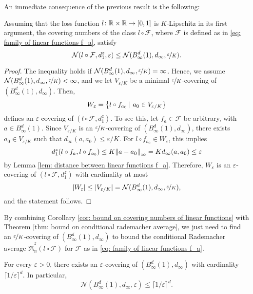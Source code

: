 An immediate consequence of the previous result is the following:

\begin{corollary}
\label{cor: bound on covering numbers of linear functions}
Assuming that the loss function $l \colon \mathbb{R} \times \mathbb{R} \to [0, 1]$ is $K$-Lipschitz in its first argument, the covering numbers of the class $l \circ \mathcal{F}$, where $\mathcal{F}$ is defined as in \eqref{eq: family of linear functions f_a}, satisfy
\[
    \mathcal{N}(l \circ \mathcal{F}, d_1^z, \varepsilon) \leq \mathcal{N}(B_{\infty}^d(1), d_{\infty}, \nicefrac{\varepsilon}{K}).
\]
\end{corollary}

\begin{proof}
The inequality holds if $\mathcal{N}(B_{\infty}^d(1), d_{\infty}, \nicefrac{\varepsilon}{K}) = \infty$. Hence, we assume $\mathcal{N}(B_{\infty}^d(1), d_{\infty}, \nicefrac{\varepsilon}{K}) < \infty$, and we let $V_{\varepsilon / K}$ be a minimal $\nicefrac{\varepsilon}{K}$-covering of $(B_{\infty}^d(1), d_{\infty})$. Then,
\[
    W_{\varepsilon} = \set{l \circ f_{a_0} \with a_0 \in V_{\varepsilon / K}}
\]
defines an $\varepsilon$-covering of $(l \circ \mathcal{F}, d_1^z)$. To see this, let $f_a \in \mathcal{F}$ be arbitrary, with $a \in B_{\infty}^d(1)$. Since $V_{\varepsilon / K}$ is an $\nicefrac{\varepsilon}{K}$-covering of $(B_{\infty}^d(1), d_{\infty})$, there exists $a_0 \in V_{\varepsilon / K}$ such that $d_{\infty}(a, a_0) \leq \varepsilon / K$. For $l \circ f_{a_0} \in W_{\varepsilon}$, this implies
\[
    d_1^z(l \circ f_a, l \circ f_{a_0}) \leq K \norm{a - a_0}_{\infty} = K d_{\infty}(a, a_0) \leq \varepsilon
\]
by Lemma \ref{lem: distance between linear functions f_a}. Therefore, $W_{\varepsilon}$ is an $\varepsilon$-covering of $(l \circ \mathcal{F}, d_1^z)$ with cardinality at most
\[
    \abs{W_{\varepsilon}} \leq \abs*{V_{\varepsilon / K}} = \mathcal{N}(B_{\infty}^d(1), d_{\infty}, \nicefrac{\varepsilon}{K}),
\]
and the statement follows.
\end{proof}

By combining Corollary \ref{cor: bound on covering numbers of linear functions} with Theorem \ref{thm: bound on conditional rademacher average}, we just need to find an $\nicefrac{\varepsilon}{K}$-covering of $(B_{\infty}^d(1), d_{\infty})$ to bound the conditional Rademacher average $\hat{\mathfrak{R}}_n^z(l \circ \mathcal{F})$ for $\mathcal{F}$ as in \eqref{eq: family of linear functions f_a}.

\begin{lemma}
For every $\varepsilon > 0$, there exists an $\varepsilon$-covering of $(B_{\infty}^d(1), d_{\infty})$ with cardinality $\lceil 1 / \varepsilon \rceil^d$. In particular,
\[
    \mathcal{N}(B_{\infty}^d(1), d_{\infty}, \varepsilon) \leq {\lceil 1 / \varepsilon \rceil}^d.
\]
\end{lemma}

